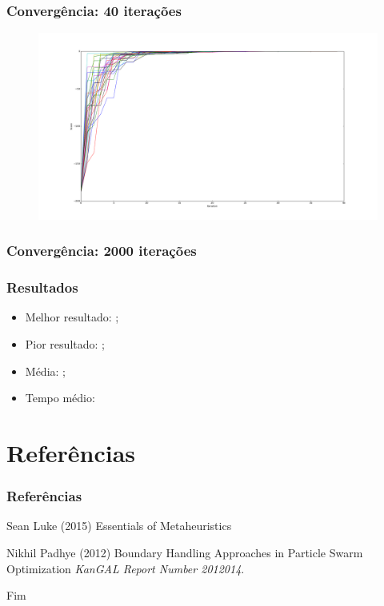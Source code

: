 \documentclass{beamer}
\begin{document}
\begin{frame}
\frametitle{Convergência: 40 iterações}
\begin{figure}
\includegraphics[width=1.0\linewidth]{convergence40.png}
\end{figure}
\end{frame}

\begin{frame}
\frametitle{Convergência: 2000 iterações}
\end{frame}

\begin{frame}
\frametitle{Resultados}
\begin{itemize}
\item Melhor resultado: ;
\item Pior resultado: ;
\item Média: ;
\item Tempo médio: 
\end{itemize}
\end{frame}

\section{Referências}

\begin{frame}
\frametitle{Referências}
\footnotesize{
\begin{thebibliography}{99} %
 Sean Luke (2015)
\newblock Essentials of Metaheuristics

 Nikhil Padhye (2012)
\newblock Boundary Handling Approaches in Particle Swarm Optimization
\newblock \emph{KanGAL Report Number 2012014}.

\end{thebibliography}
}
\end{frame}


\begin{frame}
\Huge{\centerline{Fim}}
\end{frame}

\end{document}
